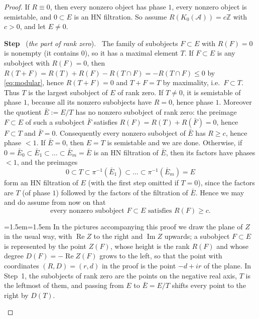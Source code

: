 \documentclass[12pt]{amsart}
\numberwithin{theorem}{section}
\theoremstyle{definition}
\newcounter{pstep}
\newcommand{\step}[1]{\par\medskip\noindent\refstepcounter{pstep}\textbf{Step \thepstep}\ (\textit{#1}).\ \ignorespaces}
\newenvironment{illustration}{\par\medskip\begingroup\footnotesize\noindent\leftskip=1.5em\rightskip=1.5em}{\par\endgroup\medskip\noindent\ignorespaces}
\newcommand{\ZZ}{\mathbb{Z}}
\newcommand{\calA}{\mathcal{A}}
\newcommand{\Kgroup}{K_0}
\newcommand{\re}{\operatorname{Re}}
\newcommand{\im}{\operatorname{Im}}
\begin{document}
	\begin{proof}
		If $R \equiv 0$, then every nonzero object has phase $1$, every nonzero object is semistable, and $0 \subset E$ is an HN filtration.
		So assume $R(\Kgroup(\calA)) = c \ZZ$ with $c > 0$, and let $E \neq 0$.
		
		\step{the part of rank zero}
		The family of subobjects $F \subset E$ with $R(F) = 0$ is nonempty (it contains $0$), so it has a maximal element $T$.
		If $F \subset E$ is any subobject with $R(F) = 0$, then $R(T + F) = R(T) + R(F) - R(T \cap F) = -R(T \cap F) \leqslant 0$ by \eqref{eq:modular}, hence $R(T + F) = 0$ and $T + F = T$ by maximality, i.e.\ $F \subset T$.
		Thus $T$ is the largest subobject of $E$ of rank zero.
		If $T \neq 0$, it is semistable of phase $1$, because all its nonzero subobjects have $R = 0$, hence phase $1$.
		Moreover the quotient $\bar E := E / T$ has no nonzero subobject of rank zero:
		the preimage $F \subset E$ of such a subobject $\bar F$ satisfies $R(F) = R(T) + R(\bar F) = 0$, hence $F \subset T$ and $\bar F = 0$.
		Consequently every nonzero subobject of $\bar E$ has $R \geqslant c$, hence phase $< 1$.
		If $\bar E = 0$, then $E = T$ is semistable and we are done.
		Otherwise, if $0 = \bar E_0 \subset \bar E_1 \subset \ldots \subset \bar E_m = \bar E$ is an HN filtration of $\bar E$, then its factors have phases $< 1$, and the preimages
		\[
		0 \subset T \subset \pi^{-1}(\bar E_1) \subset \ldots \subset \pi^{-1}(\bar E_m) = E
		\]
		form an HN filtration of $E$ (with the first step omitted if $T = 0$), since the factors are $T$ (of phase $1$) followed by the factors of the filtration of $\bar E$.
		Hence we may and do assume from now on that
		\begin{equation}
			\label{eq:no_torsion}
			\text{every nonzero subobject } F \subset E \text{ satisfies } R(F) \geqslant c .
		\end{equation}
		\begin{illustration}
		In the pictures accompanying this proof we draw the plane of $Z$ in the usual way, with $\re Z$ to the right and $\im Z$ upwards;
		a subobject $F \subset E$ is represented by the point $Z(F)$, whose height is the rank $R(F)$ and whose degree $D(F) = -\re Z(F)$ grows to the left, so that the point with coordinates $(R, D) = (r, d)$ in the proof is the point $-d + i r$ of the plane.
		In Step~1, the subobjects of rank zero are the points on the negative real axis, $T$ is the leftmost of them, and passing from $E$ to $\bar E = E / T$ shifts every point to the right by $D(T)$.
		\begin{center}

\end{center}
\end{illustration}
\end{proof}
\end{document}
